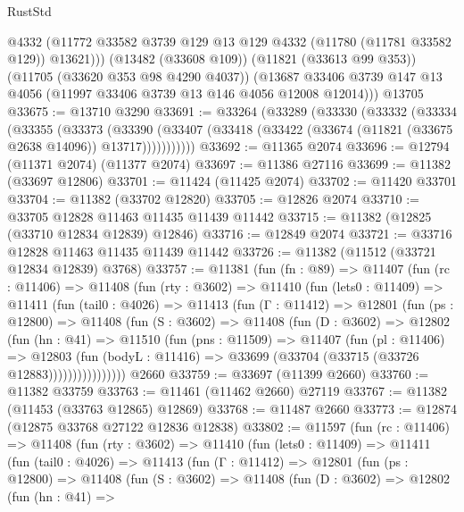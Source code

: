 \begin{lexlean}{RustStd}
\begin{coremodule}
          @4332
          (@11772 @33582 @3739 @129 @13 @129 @4332 (@11780 (@11781 @33582 @129)) @13621)))
      (@13482 (@33608 @109))
      (@11821 (@33613 @99 @353))
      (@11705 (@33620 @353 @98 @4290 @4037))
      (@13687 @33406 @3739 @147 @13 @4056 (@11997 @33406 @3739 @13 @146 @4056 @12008 @12014)))
    @13705
@33675 := @13710 @3290
@33691 := @33264
    (@33289
      (@33330
        (@33332
          (@33334
            (@33355
              (@33373
                (@33390
                  (@33407 (@33418 (@33422 (@33674 (@11821 (@33675 @2638 @14096)) @13717)))))))))))
@33692 := @11365 @2074
@33696 := @12794 (@11371 @2074) (@11377 @2074)
@33697 := @11386 @27116
@33699 := @11382 (@33697 @12806)
@33701 := @11424 (@11425 @2074)
@33702 := @11420 @33701
@33704 := @11382 (@33702 @12820)
@33705 := @12826 @2074
@33710 := @33705 @12828 @11463 @11435 @11439 @11442
@33715 := @11382 (@12825 (@33710 @12834 @12839) @12846)
@33716 := @12849 @2074
@33721 := @33716 @12828 @11463 @11435 @11439 @11442
@33726 := @11382 (@11512 (@33721 @12834 @12839) @3768)
@33757 := @11381
    (fun (fn : @89) =>
    @11407
      (fun (rc : @11406) =>
      @11408
        (fun (rty : @3602) =>
        @11410
          (fun (lets0 : @11409) =>
          @11411
            (fun (tail0 : @4026) =>
            @11413
              (fun (Γ : @11412) =>
              @12801
                (fun (ps : @12800) =>
                @11408
                  (fun (S : @3602) =>
                  @11408
                    (fun (D : @3602) =>
                    @12802
                      (fun (hn : @41) =>
                      @11510
                        (fun (pns : @11509) =>
                        @11407
                          (fun (pl : @11406) =>
                          @12803
                            (fun (bodyL : @11416) =>
                            @33699 (@33704 (@33715 (@33726 @12883))))))))))))))))
    @2660
@33759 := @33697 (@11399 @2660)
@33760 := @11382 @33759
@33763 := @11461 (@11462 @2660) @27119
@33767 := @11382 (@11453 (@33763 @12865) @12869)
@33768 := @11487 @2660
@33773 := @12874 (@12875 @33768 @27122 @12836 @12838)
@33802 := @11597
    (fun (rc : @11406) =>
    @11408
      (fun (rty : @3602) =>
      @11410
        (fun (lets0 : @11409) =>
        @11411
          (fun (tail0 : @4026) =>
          @11413
            (fun (Γ : @11412) =>
            @12801
              (fun (ps : @12800) =>
              @11408
                (fun (S : @3602) =>
                @11408
                  (fun (D : @3602) =>
                  @12802
                    (fun (hn : @41) =>

\end{coremodule}
\end{lexlean}
